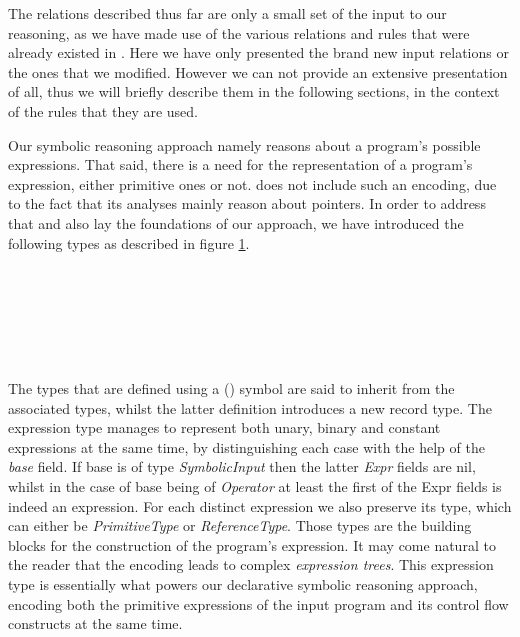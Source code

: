 The relations described thus far are only a small set of the input to our reasoning, as we have
made use of the various relations and rules that were already existed in \doop{}. Here we have
only presented the brand new input relations or the ones that we modified. However we can
not provide an extensive presentation of all, thus we will briefly describe them in the
following sections, in the context of the rules that they are used.

Our symbolic reasoning approach namely reasons about a program's possible expressions. That
said, there is a need for the representation of a program's expression, either primitive ones
or not. \doop{} does not include such an encoding, due to the fact that its analyses mainly
reason about pointers. In order to address that and also lay the foundations of our approach,
we have introduced the following types as described in figure \ref{fig:expr-type}.

\begin{figure}[th]
  \\
  \\
  \\
  \\
  \\
  \label{fig:expr-type}
\end{figure}

The types that are defined using a (\dl{|}) symbol are said to inherit from the
associated types, whilst the latter definition introduces a new record type. The
expression type manages to represent both unary, binary and constant expressions at the same time,
by distinguishing each case with the help of the \emph{base} field. If base is of type
\emph{SymbolicInput} then the latter \emph{Expr} fields are nil, whilst in the case of
base being of \emph{Operator} at least the first of the Expr fields is indeed an expression.
For each distinct expression we also preserve its type, which can either be
\emph{PrimitiveType} or \emph{ReferenceType}. Those types are the building blocks for the
construction of the program's expression. It may come natural to the reader that
the encoding leads to complex \emph{expression trees}. This expression type is essentially
what powers our declarative symbolic reasoning approach, encoding both the primitive
expressions of the input program and its control flow constructs at the same time.

